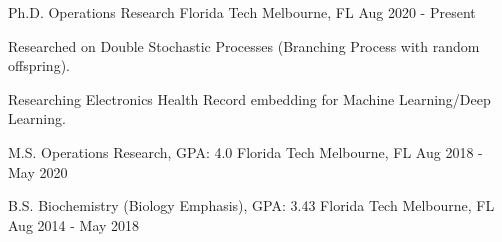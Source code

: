 \begin{cventries}

	\cventry
	{Ph.D. Operations Research}
	{Florida Tech}
	{Melbourne, FL}
	{Aug 2020 - Present}
	{\begin{cvitems}
			\item {Researched on Double Stochastic Processes (Branching Process with random offspring).}
			\item {Researching Electronics Health Record embedding for Machine Learning/Deep Learning.}
		\end{cvitems}
		\vspace{-4mm}}

	\cventry
	{M.S. Operations Research, GPA: 4.0}
	{Florida Tech}
	{Melbourne, FL}
	{Aug 2018 - May 2020}
	{}
	\vspace{-6mm}

	\cventry
	{B.S. Biochemistry (Biology Emphasis), GPA: 3.43}
	{Florida Tech}
	{Melbourne, FL}
	{Aug 2014 - May 2018}
	{}
	\vspace{-6mm}

\end{cventries}

\vspace{-2mm}